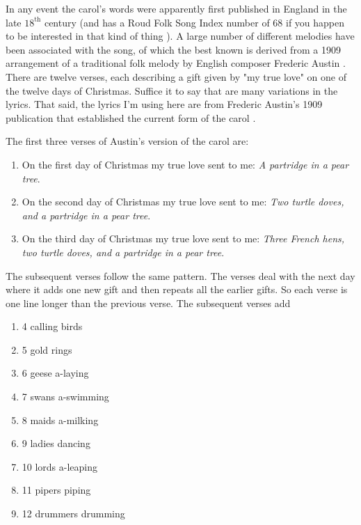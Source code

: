 \documentclass{article}
\theoremstyle{definition}
\begin{document}
\bigskip
\noindent
In any event the carol's words were apparently first published in
England in the late $18^{\text{th}}$ century (and has a Roud Folk
Song Index number of 68 if you happen to be interested in that
kind of thing \cite{wikipedia:roud_folk_song_index}). A large
number of different melodies have been associated with the song,
of which the best known is derived from a 1909 arrangement of a
traditional folk melody by English composer Frederic Austin
\cite{wikipedia:twelve_days_of_christmas}.  There are twelve
verses, each describing a gift given by "my true love" on one of
the twelve days of Christmas. Suffice it to say that are many
variations in the lyrics. That said, the lyrics I'm using here
are from Frederic Austin's 1909 publication that established the
current form of the carol \cite{wikipedia:frederic_austin}.

\bigskip
\noindent
The first three verses of Austin's version of the carol are:

\smallskip
\begin{enumerate}
\item On the first day of Christmas my true love sent to me:
\emph{A partridge in a pear tree}.

\item On the second day of Christmas my true love sent to me:
\emph{Two turtle doves, and a partridge in a pear tree}.

\item On the third day of Christmas my true love sent to me:
\emph{Three French hens, two turtle doves, and a partridge in 
a pear tree}.
\end{enumerate}

\smallskip
\noindent
The subsequent verses follow the same pattern. The verses deal
with the next day where it adds one new gift and then repeats all
the earlier gifts. So each verse is one line longer than the
previous verse. The subsequent verses add

\vspace{0.375em}
 \begin{enumerate}
   \addtocounter{enumi}{3}                                                                      %
   \item 4 calling birds
   \item 5 gold rings
   \item 6 geese a-laying
   \item 7 swans a-swimming
   \item 8 maids a-milking
   \item 9 ladies dancing
   \item 10 lords a-leaping
   \item 11 pipers piping
   \item 12 drummers drumming
 \end{enumerate}
\end{document}

